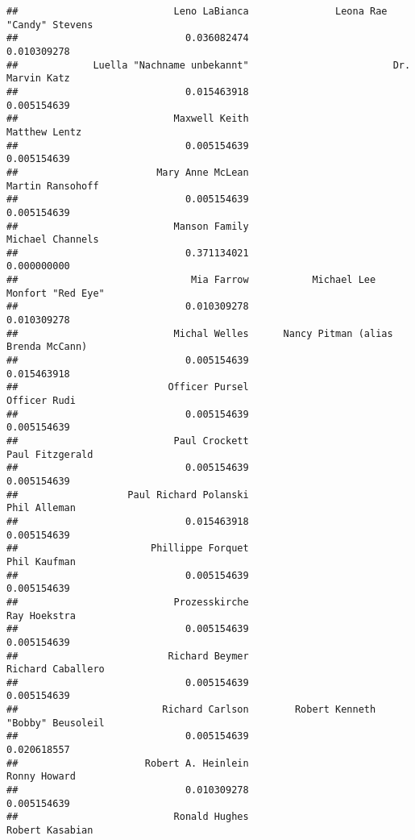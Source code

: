 \documentclass[
]{article}
\begin{document}
\begin{verbatim}
##                           Leno LaBianca               Leona Rae "Candy" Stevens 
##                             0.036082474                             0.010309278 
##             Luella "Nachname unbekannt"                         Dr. Marvin Katz 
##                             0.015463918                             0.005154639 
##                           Maxwell Keith                           Matthew Lentz 
##                             0.005154639                             0.005154639 
##                        Mary Anne McLean                        Martin Ransohoff 
##                             0.005154639                             0.005154639 
##                           Manson Family                        Michael Channels 
##                             0.371134021                             0.000000000 
##                              Mia Farrow           Michael Lee Monfort "Red Eye" 
##                             0.010309278                             0.010309278 
##                           Michal Welles      Nancy Pitman (alias Brenda McCann) 
##                             0.005154639                             0.015463918 
##                          Officer Pursel                            Officer Rudi 
##                             0.005154639                             0.005154639 
##                           Paul Crockett                         Paul Fitzgerald 
##                             0.005154639                             0.005154639 
##                   Paul Richard Polanski                            Phil Alleman 
##                             0.015463918                             0.005154639 
##                       Phillippe Forquet                            Phil Kaufman 
##                             0.005154639                             0.005154639 
##                           Prozesskirche                            Ray Hoekstra 
##                             0.005154639                             0.005154639 
##                          Richard Beymer                       Richard Caballero 
##                             0.005154639                             0.005154639 
##                         Richard Carlson        Robert Kenneth "Bobby" Beusoleil 
##                             0.005154639                             0.020618557 
##                      Robert A. Heinlein                            Ronny Howard 
##                             0.010309278                             0.005154639 
##                           Ronald Hughes                         Robert Kasabian 

\end{verbatim}
\end{document}
